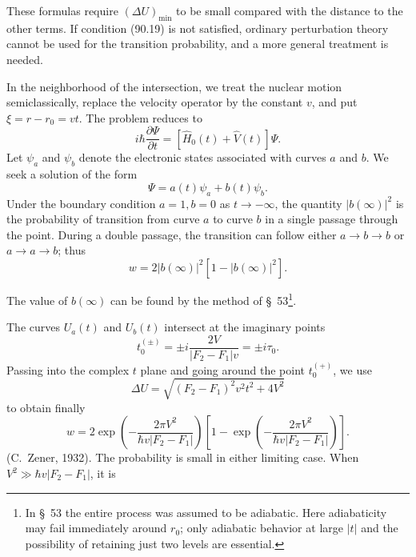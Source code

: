 These formulas require $(\Delta U)_{\min}$ to be small compared with the distance to the other terms. If condition (90.19) is not satisfied, ordinary perturbation theory cannot be used for the transition probability, and a more general treatment is needed.

In the neighborhood of the intersection, we treat the nuclear motion semiclassically, replace the velocity operator by the constant $v$, and put $\xi=r-r_0=vt$. The problem reduces to
\begin{equation}i\hbar\frac{\partial\Psi}{\partial t}=[\widehat H_0(t)+\widehat V(t)]\Psi.\tag{90.13}\end{equation}
Let $\psi_a$ and $\psi_b$ denote the electronic states associated with curves $a$ and $b$. We seek a solution of the form
\begin{equation}\Psi=a(t)\psi_a+b(t)\psi_b.\tag{90.14}\end{equation}
Under the boundary condition $a=1,b=0$ as $t\to-\infty$, the quantity $|b(\infty)|^2$ is the probability of transition from curve $a$ to curve $b$ in a single passage through the point. During a double passage, the transition can follow either $a\to b\to b$ or $a\to a\to b$; thus
\begin{equation}w=2|b(\infty)|^2[1-|b(\infty)|^2].\tag{90.15}\end{equation}

The value of $b(\infty)$ can be found by the method of \S~53\footnote{In \S~53 the entire process was assumed to be adiabatic. Here adiabaticity may fail immediately around $r_0$; only adiabatic behavior at large $|t|$ and the possibility of retaining just two levels are essential.}.

The curves $U_a(t)$ and $U_b(t)$ intersect at the imaginary points
\begin{equation}t_0^{(\pm)}=\pm i\frac{2V}{|F_2-F_1|v}=\pm i\tau_0.\tag{90.16}\end{equation}
Passing into the complex $t$ plane and going around the point $t_0^{(+)}$, we use
\begin{equation}\Delta U=\sqrt{(F_2-F_1)^2v^2t^2+4V^2}\tag{90.17}\end{equation}
to obtain finally
\begin{equation}w=2\exp\left(-\frac{2\pi V^2}{\hbar v|F_2-F_1|}\right)\left[1-\exp\left(-\frac{2\pi V^2}{\hbar v|F_2-F_1|}\right)\right].\tag{90.18}\end{equation}
(C.~Zener, 1932). The probability is small in either limiting case. When $V^2\gg\hbar v|F_2-F_1|$, it is

